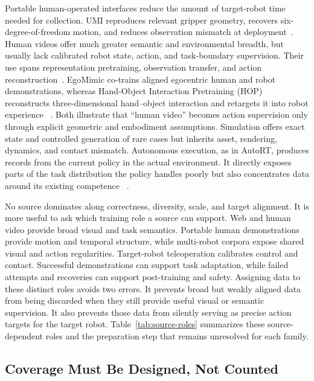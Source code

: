 Portable human-operated interfaces reduce the amount of target-robot time needed for collection.
UMI reproduces relevant gripper geometry, recovers six-degree-of-freedom motion, and reduces observation mismatch at deployment~\cite{chi2024universal_2402_10329}.
Human videos offer much greater semantic and environmental breadth, but usually lack calibrated robot state, action, and task-boundary supervision.
Their use spans representation pretraining, observation transfer, and action reconstruction~\cite{ma2026robot_2604_27621}.
EgoMimic co-trains aligned egocentric human and robot demonstrations, whereas Hand-Object Interaction Pretraining (HOP) reconstructs three-dimensional hand--object interaction and retargets it into robot experience ~\cite{kareer2024egomimic_2410_24221,singh2024hand_2409_08273}.
Both illustrate that ``human video'' becomes action supervision only through explicit geometric and embodiment assumptions.
Simulation offers exact state and controlled generation of rare cases but inherits asset, rendering, dynamics, and contact mismatch.
Autonomous execution, as in AutoRT, produces records from the current policy in the actual environment.
It directly exposes parts of the task distribution the policy handles poorly but also concentrates data around its existing competence ~\cite{ahn2024autort_2401_12963}.

No source dominates along correctness, diversity, scale, and target alignment.
It is more useful to ask which training role a source can support.
Web and human video provide broad visual and task semantics.
Portable human demonstrations provide motion and temporal structure, while multi-robot corpora expose shared visual and action regularities.
Target-robot teleoperation calibrates control and contact.
Successful demonstrations can support task adaptation, while failed attempts and recoveries can support post-training and safety.
Assigning data to these distinct roles avoids two errors.
It prevents broad but weakly aligned data from being discarded when they still provide useful visual or semantic supervision.
It also prevents those data from silently serving as precise action targets for the target robot.
Table~\ref{tab:source-roles} summarizes these source-dependent roles and the preparation step that remains unresolved for each family.



\subsection{Coverage Must Be Designed, Not Counted}

